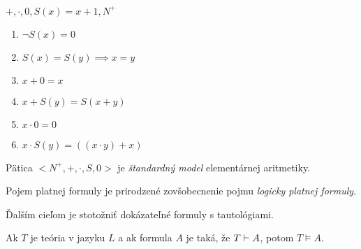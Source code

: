 \begin{priklad}

    $+, \cdot, 0, S(x) = x+1, N^+ $
    \begin{enumerate}
	\item $\neg S(x) = 0$
	\item $S(x) = S(y) \implies x=y$
	\item $x+0 = x$
	\item $x+S(y) = S(x+y)$
	\item $x \cdot 0 = 0$
	\item $x\cdot S(y) = ((x\cdot y) + x)$
    \end{enumerate}

    Pätica $<N^+, +, \cdot, S, 0>$ je
    \emph{štandardný model} elementárnej aritmetiky.
\end{priklad}

\par
Pojem platnej formuly je prirodzené zovšobecnenie pojmu \emph{logicky platnej
formuly}.

Ďalším cieľom je stotožniť dokázateľné formuly s tautológiami.

\begin{veta}[o korektnosti]
    Ak $T$ je teória v jazyku $L$ a ak formula $A$ je taká,
    že $T \vdash A$, potom $T \models A$.
\end{veta}

